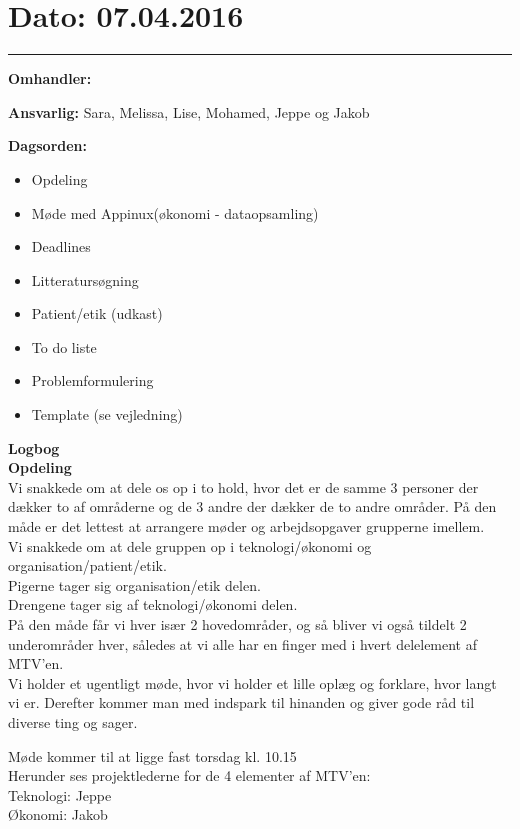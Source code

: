 \section{Dato: 07.04.2016}
\hrule

\textbf{Omhandler:}

\textbf{Ansvarlig:} Sara, Melissa, Lise, Mohamed, Jeppe og Jakob

\textbf{Dagsorden:}
\begin{itemize}
	\item Opdeling
	\item Møde med Appinux(økonomi - dataopsamling)
	\item Deadlines
	\item Litteratursøgning
	\item Patient/etik (udkast)
	\item To do liste
	\item Problemformulering
	\item Template (se vejledning)
\end{itemize}

\textbf{Logbog}
\\


\textbf{Opdeling}
\\
Vi snakkede om at dele os op i to hold, hvor det er de samme 3 personer der dækker to af områderne og de 3 andre der dækker de to andre områder. På den måde er det lettest at arrangere møder og arbejdsopgaver grupperne imellem.\\
Vi snakkede om at dele gruppen op i teknologi/økonomi og organisation/patient/etik.\\
Pigerne tager sig organisation/etik delen.\\
Drengene tager sig af teknologi/økonomi delen.\\
På den måde får vi hver især 2 hovedområder, og så bliver vi også tildelt 2 underområder hver, således at vi alle har en finger med i hvert delelement af MTV'en. \\
Vi holder et ugentligt møde, hvor vi holder et lille oplæg og forklare, hvor langt vi er. Derefter kommer man med indspark til hinanden og giver gode råd til diverse ting og sager.

Møde kommer til at ligge fast torsdag kl. 10.15\\

Herunder ses projektlederne for de 4 elementer af MTV'en: \\
Teknologi:
Jeppe\\

Økonomi:
Jakob\\

